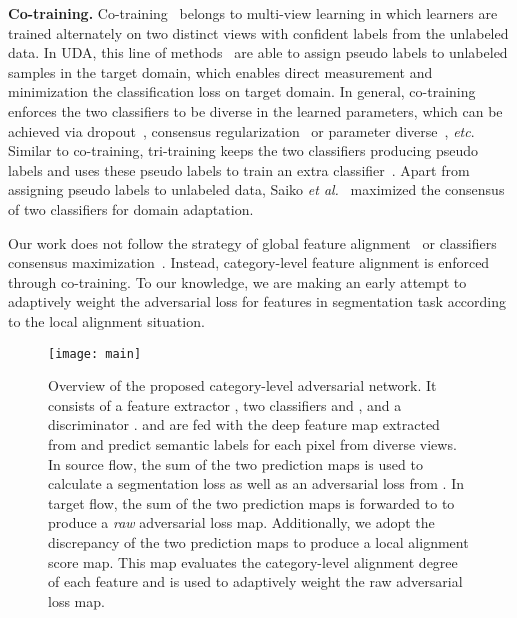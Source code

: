 \documentclass[10pt,twocolumn,letterpaper]{article}
\begin{document}
\textbf{Co-training.} 
Co-training~\cite{zhou2005cotrain} belongs to multi-view learning in which learners are trained alternately on two distinct views with confident labels from the unlabeled data. In UDA, this line of methods~\cite{zhang2017FCTN, chen2011co, saito2017asymmetric,luo2008transfer} are able to assign pseudo labels to unlabeled samples in the target domain, which enables direct measurement and minimization the classification loss on target domain. 
In general, co-training enforces the two classifiers to be diverse in the learned parameters, which can be achieved via dropout~\cite{saito2017dropout}, consensus regularization~\cite{saito2017maximum} or parameter diverse~\cite{zhang2017FCTN}, \emph{etc}. Similar to co-training, tri-training keeps the two classifiers producing pseudo labels and uses these pseudo labels to train an extra classifier~\cite{saito2017asymmetric,zhang2017FCTN}. Apart from assigning pseudo labels to unlabeled data, Saiko \emph{et al.}~\cite{saito2017dropout,saito2017maximum} maximized the consensus of two classifiers for domain adaptation. 

Our work does not follow the strategy of global feature alignment~\cite{tsai2018OutputSpace, hoffman2016fcns, solomon2015WGAN} or classifiers consensus maximization~\cite{saito2017dropout,saito2017maximum}. Instead, category-level feature alignment is enforced through co-training.  
To our knowledge, we are making an early attempt to adaptively weight the adversarial loss for features in segmentation task according to the local alignment situation. 

\begin{figure*}[ht]
\centering
\texttt{[image: main]}
\caption{Overview of the proposed category-level adversarial network. It consists of a feature extractor , two classifiers  and , and a discriminator .  and  are fed with the deep feature map extracted from  and predict semantic labels for each pixel from diverse views. In source flow, the sum of the two prediction maps is used to calculate a segmentation loss as well as an adversarial loss from . In target flow, the sum of the two prediction maps is forwarded to  to produce a \emph{raw} adversarial loss map. Additionally, we adopt the discrepancy of the two prediction maps to produce a local alignment score map. This map evaluates the category-level alignment degree of each feature and is used to adaptively weight the raw adversarial loss map.}
\label{fig:main}
\vspace{-1mm}
\end{figure*}
\end{document}
